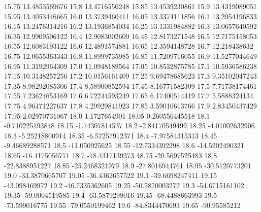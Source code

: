           15.75    13.4853569676
           15.8    13.4716550248
          15.85    13.4539230861
           15.9    13.4319089051
          15.95    13.4053446665
           16.0    13.3739460411
          16.05    13.3374111856
           16.1    13.2954196833
          16.15    13.2476314216
           16.2    13.1936854034
          16.25    13.1331984882
           16.3    13.0657640592
          16.35    12.9909506122
           16.4    12.9083002609
          16.45    12.8173271548
           16.5    12.7175158053
          16.55    12.6083193122
           16.6    12.4891574881
          16.65    12.3594148728
           16.7     12.218438632
          16.75    12.0655363343
           16.8    11.8999735985
          16.85    11.7209716055
           16.9    11.5277044649
          16.95    11.3192964309
           17.0    11.0948189564
          17.05    10.8532875785
           17.1    10.5936586238
          17.15    10.3148257256
           17.2    10.0156161409
          17.25    9.69478685623
           17.3    9.35102047243
          17.35    8.98292085306
           17.4    8.58900852594
          17.45    8.16771582309
           17.5    7.71738174461
          17.55    7.23624653169
           17.6    6.72244593249
          17.65    6.17400514419
           17.7     5.5888324134
          17.75    4.96471227637
           17.8    4.29929841923
          17.85    3.59010613766
           17.9    2.83450437429
          17.95    2.02970731067
           18.0     1.1727654901
          18.05   0.260556445518
           18.1  -0.710225193848
          18.15   -1.74307814537
           18.2   -2.84170549499
          18.25   -4.01002632906
           18.3   -5.25218800914
          18.35   -6.57257912371
           18.4   -7.97584315313
          18.45   -9.46689288571
           18.5    -11.050925625
          18.55   -12.7334392298
           18.6   -14.5202490321
          18.65   -16.4175056771
           18.7   -18.4317139373
          18.75   -20.5697525483
           18.8   -22.8388951227
          18.85   -25.2468321979
           18.9   -27.8016944761
          18.95   -30.5120773201
           19.0   -33.3870665707
          19.05   -36.4362657522
           19.1   -39.6698247411
          19.15    -43.098469972
           19.2   -46.7335362605
          19.25   -50.5870003272
           19.3   -54.6715161102
          19.35   -59.0004519585
           19.4   -63.5879298016
          19.45   -68.4488663993
           19.5    -73.599016775
          19.55   -79.0550199462
           19.6   -84.8344470693
          19.65     -90.95585212
